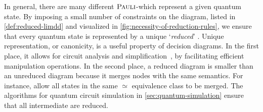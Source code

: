 In general, there are many different $\textsc{Pauli}$-\limdds which represent a given quantum state.
By imposing a small number of constraints on the diagram, listed in \autoref{def:reduced-limdd} and visualized in \autoref{fig:necessity-of-reduction-rules}, we ensure that every quantum state is represented by a unique `\emph{reduced}' \limdd.
Unique representation, or canonicity, is a useful property of decision diagrams.
In the first place, it allows for circuit analysis and simplification~\cite{bryant1995verification,miller2006qmdd}, by
 facilitating efficient manipulation operations.
In the second place, a reduced diagram is smaller than an unreduced diagram because it merges nodes with the same semantics. For instance, \limdds allow all states in the same $\simeq$ equivalence class to be merged.
The algorithms for quantum circuit simulation in \autoref{sec:quantum-simulation} ensure that all intermediate \limdds are reduced.




